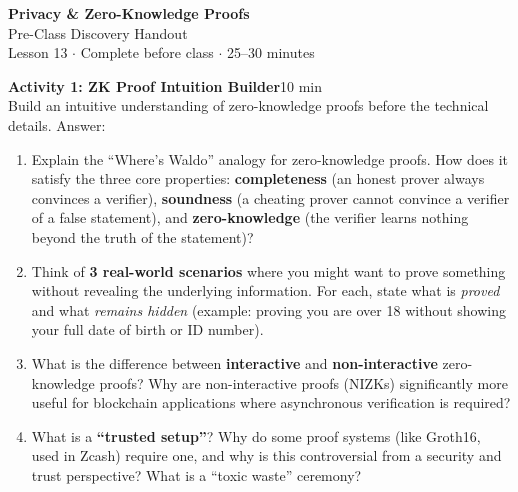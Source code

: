 \documentclass[11pt,a4paper]{article}
\newcommand{\activitybox}[3]{%
  \noindent\colorbox{mllavender4}{\parbox{\dimexpr\linewidth-2\fboxsep}{%
    \textbf{\color{mlpurple}#1}\hfill\textcolor{mlgray}{\small #2}\\[2pt]#3%
  }}\par\vspace{4pt}%
}
\begin{document}
\begin{center}
{\LARGE\color{mlpurple}\textbf{Privacy \& Zero-Knowledge Proofs}}\\[4pt]
{\large\color{mlblue}Pre-Class Discovery Handout}\\[2pt]
{\small\color{mlgray}Lesson 13 $\cdot$ Complete before class $\cdot$ 25--30 minutes}
\end{center}
\vspace{4pt}

\activitybox{Activity 1: ZK Proof Intuition Builder}{10 min}{%
Build an intuitive understanding of zero-knowledge proofs before the technical details. Answer:
\begin{enumerate}
\item Explain the ``Where's Waldo'' analogy for zero-knowledge proofs. How does it satisfy the three core properties: \textbf{completeness} (an honest prover always convinces a verifier), \textbf{soundness} (a cheating prover cannot convince a verifier of a false statement), and \textbf{zero-knowledge} (the verifier learns nothing beyond the truth of the statement)?
\item Think of \textbf{3 real-world scenarios} where you might want to prove something without revealing the underlying information. For each, state what is \emph{proved} and what \emph{remains hidden} (example: proving you are over 18 without showing your full date of birth or ID number).
\item What is the difference between \textbf{interactive} and \textbf{non-interactive} zero-knowledge proofs? Why are non-interactive proofs (NIZKs) significantly more useful for blockchain applications where asynchronous verification is required?
\item What is a \textbf{``trusted setup''}? Why do some proof systems (like Groth16, used in Zcash) require one, and why is this controversial from a security and trust perspective? What is a ``toxic waste'' ceremony?
\end{enumerate}
\vspace{2pt}
}

\vspace{2pt}
\end{document}
